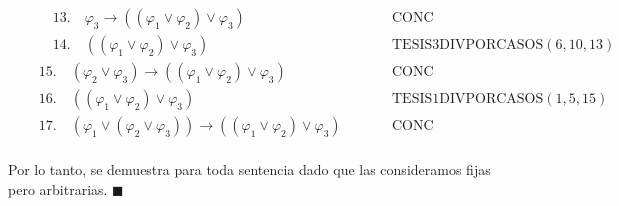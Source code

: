 \documentclass{article}
\begin{document}
\begin{equation*}
\begin{alignedat}{2}
     & \qquad 13. \quad \varphi_3\to((\varphi_1\lor\varphi_2)\lor\varphi_3)                              &  & \qquad\text{CONC}                              \\
     & \qquad 14. \quad ((\varphi_1\lor\varphi_2)\lor\varphi_3)                                          &  & \qquad\text{TESIS}3\text{DIVPORCASOS}(6,10,13) \\
     & \quad 15. \quad (\varphi_2\lor\varphi_3)\to((\varphi_1\lor\varphi_2)\lor\varphi_3)                &  & \qquad\text{CONC}                              \\
     & \quad 16. \quad ((\varphi_1\lor\varphi_2)\lor\varphi_3)                                           &  & \qquad\text{TESIS}1\text{DIVPORCASOS}(1,5,15)  \\
     & \quad 17. \quad (\varphi_1\lor(\varphi_2\lor\varphi_3))\to((\varphi_1\lor\varphi_2)\lor\varphi_3) &  & \qquad\text{CONC}                              \\
  \end{alignedat}
\end{equation*}

Por lo tanto, se demuestra para toda sentencia dado que las consideramos fijas pero arbitrarias. $\blacksquare$
\end{document}
